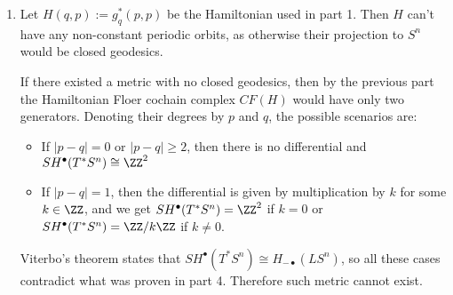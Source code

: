 \begin{enumerate}
    \item Let $H(q,p):=g^*_q(p,p)$ be the Hamiltonian used in part 1. Then $H$ can't have any non-constant periodic orbits, as otherwise their projection to $S^n$ would be  closed geodesics. 
    
    If there existed a metric with no closed geodesics, then by the previous part the Hamiltonian Floer cochain complex $CF(H)$ would have only two generators. Denoting their degrees by $p$ and $q$, the possible scenarios are:
    \begin{itemize}
        \item If $|p-q|=0$ or $|p-q|\geq 2$, then there is no differential and $SH^\bullet(T^*S^n)\cong\ZZ^2$
        \item If $|p-q|=1$, then the differential is given by multiplication by $k$ for some $k\in \ZZ$, and we get $SH^\bullet(T^*S^n)=\ZZ^2$ if $k=0$ or $SH^\bullet(T^*S^n)=\ZZ/k\ZZ$ if $k\neq0$.
    \end{itemize} 
    Viterbo's theorem states that $SH^\bullet(T^*S^n)\cong H_{-\bullet}(LS^n)$, so all these cases contradict what was proven in part 4. Therefore such metric cannot exist.
\end{enumerate}
 